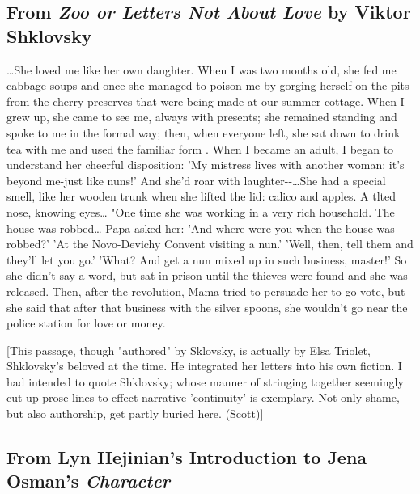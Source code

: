 \documentclass[
]{memoir}
\begin{document}
\hypertarget{from-zoo-or-letters-not-about-love-by-viktor-shklovsky}{%
\subsection*{\texorpdfstring{From \emph{Zoo or Letters Not About Love}
by Viktor
Shklovsky}{From Zoo or Letters Not About Love by Viktor Shklovsky}}\label{from-zoo-or-letters-not-about-love-by-viktor-shklovsky}}

\ldots{}She loved me like her own daughter. When I was two months old,
she fed me cabbage soups and once she managed to poison me by gorging
herself on the pits from the cherry preserves that were being made at
our summer cottage. When I grew up, she came to see me, always with
presents; she remained standing and spoke to me in the formal way; then,
when everyone left, she sat down to drink tea with me and used the
familiar form . When I became an adult, I began to understand her
cheerful disposition: 'My mistress lives with another woman; it's beyond
me-just like nuns!' And she'd roar with laughter-\/-\ldots{}She had a
special smell, like her wooden trunk when she lifted the lid: calico and
apples. A tlted nose, knowing eyes\ldots{} "One time she was working in
a very rich household. The house was robbed\ldots{} Papa asked her: 'And
where were you when the house was robbed?' 'At the Novo-Devichy Convent
visiting a nun.' 'Well, then, tell them and they'll let you go.' 'What?
And get a nun mixed up in such business, master!' So she didn't say a
word, but sat in prison until the thieves were found and she was
released. Then, after the revolution, Mama tried to persuade her to go
vote, but she said that after that business with the silver spoons, she
wouldn't go near the police station for love or money.

{[}This passage, though "authored" by Sklovsky, is actually by Elsa
Triolet, Shklovsky's beloved at the time. He integrated her letters into
his own fiction. I had intended to quote Shklovsky; whose manner of
stringing together seemingly cut-up prose lines to effect narrative
'continuity' is exemplary. Not only shame, but also authorship, get
partly buried here. (Scott){]}

\hypertarget{from-lyn-hejinians-introduction-to-jena-osmans-character}{%
\subsection*{\texorpdfstring{From Lyn Hejinian's Introduction to Jena
Osman's
\emph{Character}}{From Lyn Hejinian's Introduction to Jena Osman's Character}}\label{from-lyn-hejinians-introduction-to-jena-osmans-character}}
\end{document}
